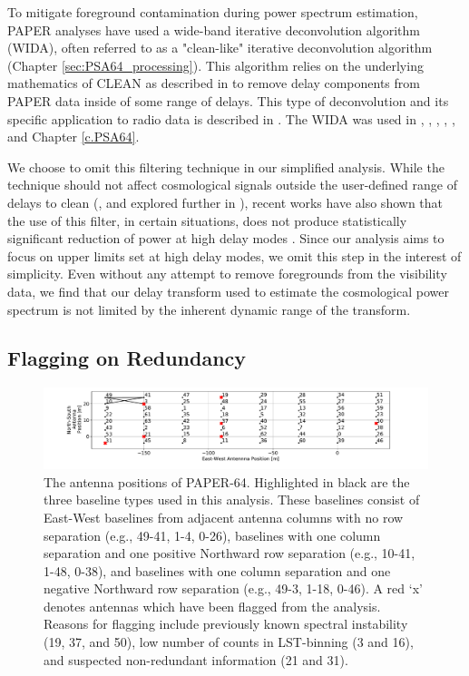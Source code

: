 To mitigate foreground contamination during
power spectrum estimation, PAPER analyses have used
a wide-band iterative deconvolution algorithm (WIDA),
often referred to as a "clean-like" iterative
deconvolution algorithm (Chapter \ref{sec:PSA64_processing}). This algorithm relies on the
underlying mathematics of CLEAN as described in
\citet{hogbom1974} to remove delay components from
PAPER data inside of some range of delays.
This type of deconvolution and its specific
application to radio data is described in \citet{parsons_backer2009}.
The WIDA was used in \citet{parsons_et_al2012b}, \citet{parsons_et_al2014}, \citet{jacobs_et_al2015}, , \citet{kerrigan_et_al2018}, and Chapter \ref{c.PSA64}.

We choose to omit this filtering technique in our simplified analysis. While the technique should not
affect cosmological signals outside the user-defined
range of delays to clean (\citealt{parsons_backer2009, parsons_et_al2012b, parsons_et_al2014}, and explored further in \citealt{kerrigan_et_al2018}),
recent works have also shown that the use of this filter, in certain situations, does not produce
statistically significant reduction of power at
high delay modes \citep{kerrigan_et_al2018}.
Since our analysis aims to focus on upper limits set
at high delay modes, we omit this step in the interest
of simplicity. Even without any attempt to remove foregrounds from the
visibility data, we find that our delay transform used to estimate
the cosmological power spectrum is not limited by the inherent
dynamic range of the transform.

\subsection{Flagging on Redundancy}
\label{sec:redundancy}

\begin{figure}[tp]
\centering
\includegraphics[trim={3cm 0  4cm 0},width=\textwidth]{plots/psa64_antpos_flagged.pdf}
\caption{The antenna positions of PAPER-64.
Highlighted in black are the three baseline types used in this analysis.
These baselines consist of East-West baselines from adjacent
antenna columns with no row separation
(e.g., 49-41, 1-4, 0-26),
baselines with one column separation and one positive Northward
row separation (e.g., 10-41, 1-48, 0-38),
and baselines with one column separation
and one negative Northward row separation
(e.g., 49-3, 1-18, 0-46). A red `x' denotes antennas which have been flagged from the analysis. Reasons for
flagging include previously known spectral instability (19, 37, and 50), low number of counts in LST-binning (3 and 16), and suspected non-redundant information (21 and 31).} \label{fig:ant_pos}
\end{figure}

